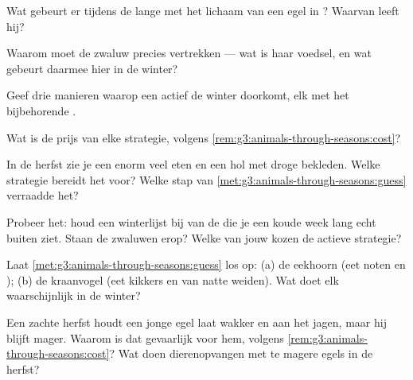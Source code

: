\begin{exercise}[$\star$]\label{exo:g3:animals-through-seasons:3}
Wat gebeurt er tijdens de lange  met het lichaam van een egel in
? Waarvan leeft hij?
\end{exercise}

\begin{exercise}[$\star$]\label{exo:g3:animals-through-seasons:4}
Waarom moet de zwaluw precies vertrekken --- wat is haar voedsel, en
wat gebeurt daarmee hier in de winter?
\end{exercise}

\begin{exercise}[$\star$]\label{exo:g3:animals-through-seasons:5}
Geef drie manieren waarop een actief  de winter doorkomt, elk met
het bijbehorende .
\end{exercise}

\begin{exercise}[$\star$]\label{exo:g3:animals-through-seasons:6}
Wat is de prijs van elke strategie, volgens
\cref{rem:g3:animals-through-seasons:cost}?
\end{exercise}

\begin{exercise}[$\star$]\label{exo:g3:animals-through-seasons:7}
In de herfst zie je een  enorm veel eten en een hol met droge
 bekleden. Welke strategie bereidt het voor? Welke stap van
\cref{met:g3:animals-through-seasons:guess} verraadde het?
\end{exercise}

\begin{exercise}[$\star$]\label{exo:g3:animals-through-seasons:8}
Probeer het: houd een winterlijst bij van de  die je een koude
week lang echt buiten ziet. Staan de zwaluwen erop? Welke van jouw
 kozen de actieve strategie?
\end{exercise}

\begin{exercise}[$\star\star$]\label{exo:g3:animals-through-seasons:9}
Laat \cref{met:g3:animals-through-seasons:guess} los op: (a) de
eekhoorn (eet noten en ); (b) de kraanvogel (eet kikkers en
 van natte weiden). Wat doet elk waarschijnlijk in de winter?
\end{exercise}

\begin{exercise}[$\star\star$]\label{exo:g3:animals-through-seasons:10}
Een zachte herfst houdt een jonge egel laat wakker en aan het jagen,
maar hij blijft mager. Waarom is dat gevaarlijk voor hem, volgens
\cref{rem:g3:animals-through-seasons:cost}? Wat doen dierenopvangen met
te magere egels in de herfst?
\end{exercise}
